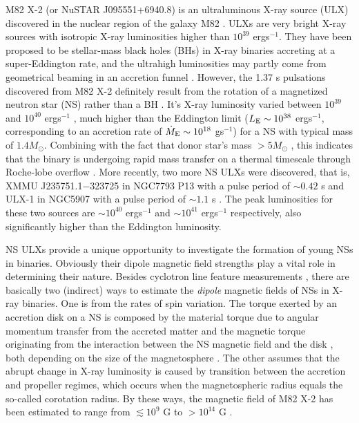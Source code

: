 \documentclass[12pt,preprint]{aastex}
\begin{document}
M82 X-2 (or NuSTAR J095551+6940.8) is an ultraluminous X-ray source (ULX) discovered in the nuclear region of the galaxy M82 \citep{ksl2006,kyh2007,fs2011}. ULXs are very bright X-ray sources with isotropic X-ray luminosities higher than $10^{39}$ ergs$^{-1}$. They have been proposed to be stellar-mass black holes (BHs) in X-ray binaries accreting at a super-Eddington rate, and the ultrahigh luminosities may partly come from geometrical beaming in an accretion funnel \citep{kdw2001, r2007}.
However, the 1.37 s pulsations discovered from M82 X-2 definitely result from the rotation of a magnetized neutron star (NS) rather than a BH \citep{bhw2014}. It's X-ray luminosity  varied between $10^{39}$ and $10^{40}$ ergs$^{-1}$ \citep{b2016}, much higher than the Eddington limit ($L_{\rm E}\sim 10^{38}$ ergs$^{-1}$, corresponding to an accretion rate of $\dot{M}_{\rm E}\sim 10^{18}$ gs$^{-1}$) for a NS with typical mass of $1.4 M_\odot$. Combining with the fact that donor star's mass $>5M_\odot$ \citep{bhw2014}, this indicates that the binary is undergoing rapid mass transfer on a thermal timescale through Roche-lobe overflow \citep{sl2015,flk2015}. More recently, two more NS ULXs were discovered, that is, XMMU J235751.1$-$323725 in NGC7793 P13 with a pulse period of $\sim 0.42$ s  \citep{i2016b,f2016} and ULX-1 in NGC5907 with a pulse period of $\sim 1.1$ s \citep{i2016a}. The peak luminosities for these two sources are $\sim 10^{40}$ ergs$^{-1}$ and $\sim 10^{41}$ ergs$^{-1}$ respectively, also significantly higher than the Eddington luminosity.

NS ULXs provide a unique opportunity to investigate the formation of young NSs in binaries. Obviously their dipole magnetic field strengths play a vital role in determining their nature.
Besides cyclotron line feature measurements \citep[][for reviews] {c2002,cw2012}, there are basically two (indirect) ways to estimate the {\em dipole} magnetic fields of NSs in X-ray binaries. One is from the rates of spin variation. The torque exerted by an accretion disk on a NS is composed by the material torque due to angular momentum transfer from the accreted matter and the magnetic torque originating from the interaction between the NS magnetic field and the disk \citep{gl1979}, both depending on the size of the magnetosphere \citep{bc2017}.  The other assumes that the abrupt change in X-ray luminosity is caused by transition between the accretion and propeller regimes, which occurs when the magnetospheric radius equals the so-called corotation radius. By these ways, the magnetic field of M82 X-2 has been estimated to range from $\lesssim 10^9$ G to $>10^{14}$ G \citep{bhw2014,eac2015,t2015,kl2015,dps2015,dpp2016,ckl2016,tmsp2016,km2016,kl2016,c2016}.
\end{document}

